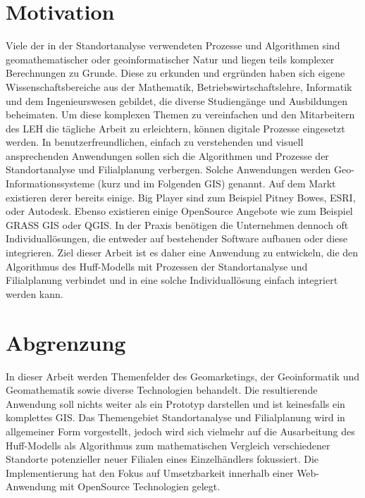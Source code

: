 \section{Motivation}
Viele der in der Standortanalyse verwendeten Prozesse und Algorithmen sind geomathematischer oder geoinformatischer Natur und liegen teils komplexer Berechnungen zu Grunde.
Diese zu erkunden und ergründen haben sich eigene Wissenschaftsbereiche aus der Mathematik, Betriebswirtschaftslehre, Informatik und dem Ingenieurswesen gebildet, die diverse Studiengänge und Ausbildungen beheimaten.
Um diese komplexen Themen zu vereinfachen und den Mitarbeitern des LEH die tägliche Arbeit zu erleichtern, können digitale Prozesse eingesetzt werden.
In benutzerfreundlichen, einfach zu verstehenden und visuell ansprechenden Anwendungen sollen sich die Algorithmen und Prozesse der Standortanalyse und Filialplanung verbergen. 
Solche Anwendungen werden Geo-Informationssysteme (kurz und im Folgenden GIS) genannt.
Auf dem Markt existieren derer bereits einige.
Big Player sind zum Beispiel Pitney Bowes, ESRI, oder Autodesk.
Ebenso existieren einige OpenSource Angebote wie zum Beispiel GRASS GIS oder QGIS.
In der Praxis benötigen die Unternehmen dennoch oft Individuallösungen, die entweder auf bestehender Software aufbauen oder diese integrieren.
Ziel dieser Arbeit ist es daher eine Anwendung zu entwickeln, die den Algorithmus des Huff-Modells mit Prozessen der Standortanalyse und Filialplanung verbindet und in eine solche Individuallösung einfach integriert werden kann.


\section{Abgrenzung}
In dieser Arbeit werden Themenfelder des Geomarketings, der Geoinformatik und Geomathematik sowie diverse Technologien behandelt. 
Die resultierende Anwendung soll nichts weiter als ein Prototyp darstellen und ist keinesfalls ein komplettes GIS. 
Das Themengebiet Standortanalyse und Filialplanung wird in allgemeiner Form vorgestellt, jedoch wird sich vielmehr auf die Ausarbeitung des Huff-Modells als Algorithmus zum mathematischen Vergleich verschiedener Standorte potenzieller neuer Filialen eines Einzelhändlers fokussiert.
Die Implementierung hat den Fokus auf Umsetzbarkeit innerhalb einer Web-Anwendung mit OpenSource Technologien gelegt. 